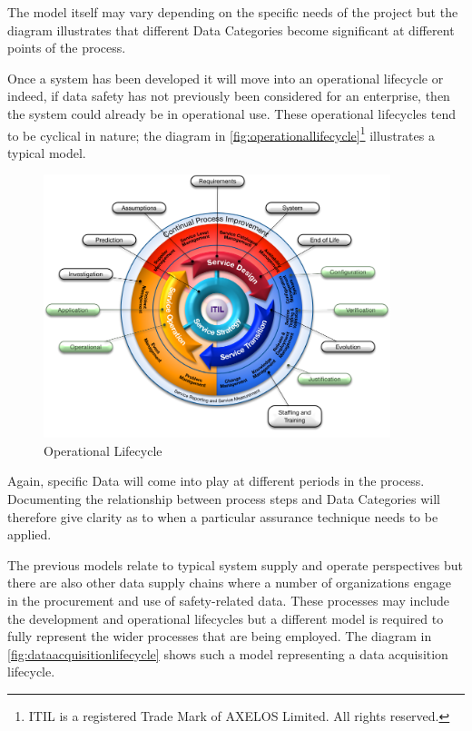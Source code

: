The model itself may vary depending on the specific needs of the project but the diagram illustrates that different Data Categories become significant at different points of the process. 

 Once a system has been developed it will move into an operational lifecycle or indeed, if data safety has not previously been considered for an enterprise, then the system could already be in operational use. These operational lifecycles tend to be cyclical in nature; the diagram in \autoref{fig:operationallifecycle}\footnote{ITIL is a registered Trade Mark of AXELOS Limited. All rights reserved.} illustrates a typical model.

\begin{figure}[htbp]
  \centering
  \includegraphics[width=0.9\textwidth]{images/operationallifecycleflat}
  \caption{Operational Lifecycle}
  \label{fig:operationallifecycle}
\end{figure}

Again, specific Data  will come into play at different periods in the process. Documenting the relationship between process steps and Data Categories will therefore give clarity as to when a particular assurance technique needs to be applied.

 The previous models relate to typical system supply and operate perspectives but there are also other data supply chains where a number of organizations engage in the procurement and use of safety-related data. These processes may include the development and operational lifecycles but a different model is required to fully represent the wider processes that are being employed. The diagram in \autoref{fig:dataacquisitionlifecycle} shows such a model representing a data acquisition lifecycle.

